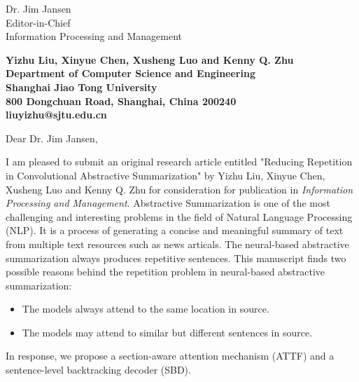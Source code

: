 \documentclass[11pt]{letter} %
\begin{document}

\begin{letter}{Dr. Jim Jansen \\
Editor-in-Chief  \\
Information Processing and Management} 


\begin{center}
\large\bf Yizhu Liu, Xinyue Chen, Xusheng Luo and Kenny Q. Zhu \\ %
Department of Computer Science and Engineering \\ Shanghai Jiao Tong University \\ 800 Dongchuan Road, Shanghai, China 200240 \\
liuyizhu@sjtu.edu.cn
\end{center} 
\vfill

\signature{Yizhu Liu} %


\opening{Dear Dr. Jim Jansen,} 

I am pleased to submit an original research article entitled 
"Reducing Repetition in Convolutional Abstractive Summarization" by Yizhu Liu, Xinyue Chen, Xusheng Luo and Kenny Q. Zhu 
for consideration for publication in \textit{Information Processing and Management}. 
Abstractive Summarization is one of the most challenging and interesting problems 
in the field of Natural Language Processing (NLP). 
It is a process of generating a concise and meaningful summary of text from multiple text resources 
such as news articals.
The neural-based abstractive summarization always produces repetitive sentences.
This manuscript finds two possible reasons behind the repetition problem in neural-based abstractive summarization: 
\begin{itemize}
\item The models always attend to the same location in source.
\item The models may attend to similar but different sentences in source. 
\end{itemize}
In response, we propose a section-aware attention mechanism (ATTF) and a sentence-level backtracking decoder (SBD).


\end{letter}
\end{document}
